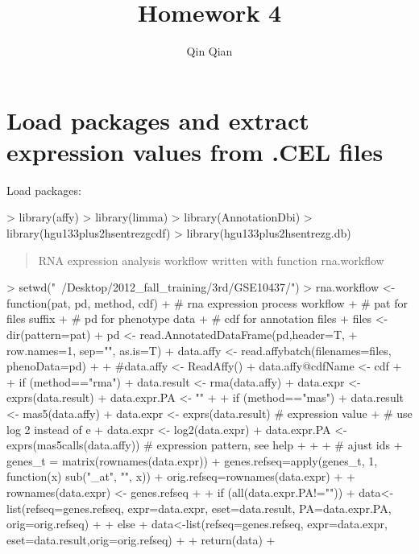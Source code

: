 \documentclass[12pt]{article}
\begin{document}
\title{Homework 4}
\author{Qin Qian}

\maketitle
\vspace{-1cm}

\section{Load packages and extract expression values from .CEL files}
Load packages:
\begin{Schunk}
\begin{Sinput}
> library(affy)
> library(limma)
> library(AnnotationDbi)
> library(hgu133plus2hsentrezgcdf)      
> library(hgu133plus2hsentrezg.db)  
\end{Sinput}
\end{Schunk}

\begin{quotation}
RNA expression analysis workflow written with function rna.workflow
\end{quotation}

\begin{Schunk}
\begin{Sinput}
> setwd("~/Desktop/2012_fall_training/3rd/GSE10437/")
> rna.workflow <- function(pat, pd, method, cdf){
+   # rna expression process workflow
+   # pat for files suffix
+   # pd for phenotype data
+   # cdf for annotation files
+   files <- dir(pattern=pat)
+   pd <- read.AnnotatedDataFrame(pd,header=T,
+                                row.names=1, sep="", as.is=T)
+   data.affy <- read.affybatch(filenames=files, phenoData=pd)
+   
+   #data.affy <- ReadAffy()
+   data.affy@cdfName <- cdf
+   
+   if (method=="rma") {
+     data.result <- rma(data.affy)
+     data.expr <- exprs(data.result)
+     data.expr.PA <- ""
+   }
+   if (method=="mas"){
+     data.result <- mas5(data.affy)
+     data.expr <- exprs(data.result)   # expression value
+     # use log 2 instead of e
+     data.expr <- log2(data.expr)
+     data.expr.PA <- exprs(mas5calls(data.affy)) # expression pattern, see help
+   }
+ 
+   # ajust ids
+   genes_t = matrix(rownames(data.expr))
+   genes.refseq=apply(genes_t, 1, function(x) sub("_at", "", x))
+   orig.refseq=rownames(data.expr)
+ 
+   rownames(data.expr) <- genes.refseq
+ 
+   if (all(data.expr.PA!="")) {
+     data<-list(refseq=genes.refseq, expr=data.expr, eset=data.result, PA=data.expr.PA, orig=orig.refseq)
+   }
+   else{
+     data<-list(refseq=genes.refseq, expr=data.expr, eset=data.result,orig=orig.refseq)
+   }
+   return(data)
+ }
\end{Sinput}
\end{Schunk}
\end{document}
